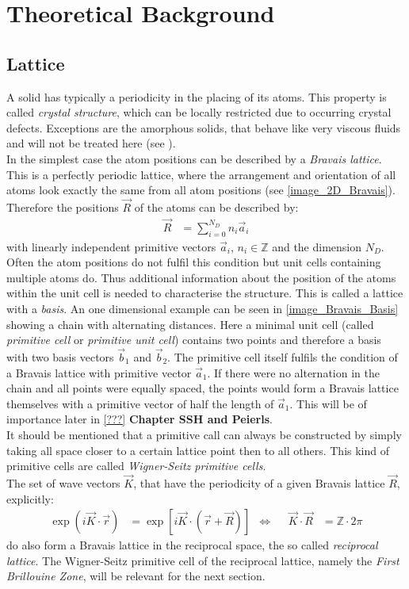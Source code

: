 \section{Theoretical Background}
\subsection{Lattice}
A solid has typically a periodicity in the placing of its atoms. This property is called \emph{crystal structure}, which can be locally restricted due to occurring crystal defects. Exceptions are the amorphous solids, that behave like very viscous fluids and will not be treated here (see \cite{ashcroft, gerthsen}).\\
In the simplest case the atom positions can be described by a \emph{Bravais lattice}. This is a perfectly periodic lattice, where the arrangement and orientation of all atoms look exactly the same from all atom positions (see \cref{image_2D_Bravais}). Therefore the positions $\vec{R}$ of the atoms can be described by:
\begin{align}
	\vec{R} &= \sum_{i = 0}^{N_D} n_i \vec{a}_i
\end{align}
with linearly independent primitive vectors $\vec{a}_i$, $n_i \in \mathbb{Z}$ and the dimension $N_D$.\\ Often the atom positions do not fulfil this condition but unit cells containing multiple atoms do. Thus additional information about the position of the atoms within the unit cell is needed to characterise the structure. This is called a lattice with a \emph{ basis}. An one dimensional example can be seen in \cref{image_Bravais_Basis} showing a chain with alternating distances. Here a minimal unit cell (called \emph{primitive cell} or \emph{primitive unit cell}) contains two points and therefore a basis with two basis vectors $\vec{b}_1$ and $\vec{b}_2$. The primitive cell itself fulfils the condition of a Bravais lattice with primitive vector $\vec{a}_1$. If there were no alternation in the chain and all points were equally spaced, the points would form a Bravais lattice themselves with a primitive vector of half the length of $\vec{a}_1$. This will be of importance later in \cref{???} \textbf{Chapter SSH and Peierls}.\\
It should be mentioned that a primitive call can always be constructed by simply taking all space closer to a certain lattice point then to all others. This kind of primitive cells are called \emph{Wigner-Seitz primitive cells}.\\
The set of wave vectors $\vec{K}$, that have the periodicity of a given Bravais lattice $\vec{R}$, explicitly:
\begin{align}
\exp\left(i\vec{K}\cdot\vec{r}\right) &= \exp\left[i\vec{K}\cdot\left(\vec{r} + \vec{R}\right)\right] &\Leftrightarrow& &\vec{K}\cdot\vec{R} &= \mathbb{Z}\cdot 2\pi	
\end{align}
do also form a Bravais lattice in the reciprocal space, the so called \emph{reciprocal lattice}. The Wigner-Seitz primitive cell of the reciprocal lattice, namely the \emph{First Brillouine Zone}, will be relevant for the next section.

